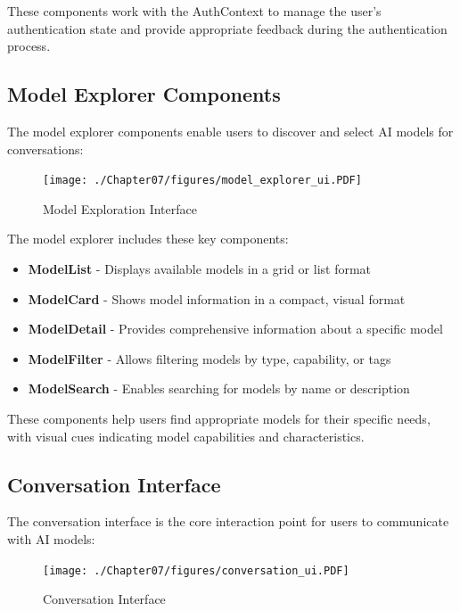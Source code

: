 These components work with the AuthContext to manage the user's authentication state and provide appropriate feedback during the authentication process.

\subsection{Model Explorer Components}

The model explorer components enable users to discover and select AI models for conversations:

\begin{figure}
    \centering
    \texttt{[image: ./Chapter07/figures/model\_explorer\_ui.PDF]}
    \caption{Model Exploration Interface}
    \label{fig:model-explorer-ui}
\end{figure}
\clearpage

The model explorer includes these key components:

\begin{itemize}
  \item \textbf{ModelList} - Displays available models in a grid or list format
  \item \textbf{ModelCard} - Shows model information in a compact, visual format
  \item \textbf{ModelDetail} - Provides comprehensive information about a specific model
  \item \textbf{ModelFilter} - Allows filtering models by type, capability, or tags
  \item \textbf{ModelSearch} - Enables searching for models by name or description
\end{itemize}

These components help users find appropriate models for their specific needs, with visual cues indicating model capabilities and characteristics.

\subsection{Conversation Interface}

The conversation interface is the core interaction point for users to communicate with AI models:

\begin{figure}
    \centering
      \texttt{[image: ./Chapter07/figures/conversation\_ui.PDF]}
    \caption{Conversation Interface}
    \label{fig:conversation-ui}
\end{figure}
\clearpage

